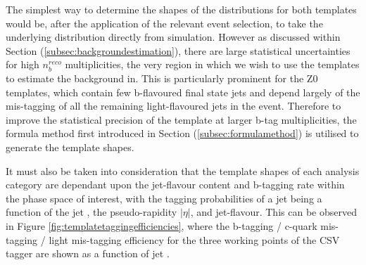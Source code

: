 The simplest way to determine the shapes of the \nbreco distributions for both templates would be, after the application of the relevant event selection, to take the underlying \nbreco distribution directly from simulation. However as discussed within Section (\ref{subsec:backgroundestimation}), there are large statistical uncertainties for high $n_{b}^{reco}$ multiplicities, the very region in which we wish to use the templates to estimate the background in. This is particularly prominent for the Z0 templates, which contain few b-flavoured final state jets and depend largely of the mis-tagging of all the remaining light-flavoured jets in the event. Therefore to improve the statistical precision of the template at larger b-tag multiplicities, the formula method first introduced in Section (\ref{subsec:formulamethod}) is utilised to generate the template shapes. 

It must also be taken into consideration that the template shapes of each analysis category are dependant upon the jet-flavour content and b-tagging rate within the phase space of interest, with the tagging probabilities of a jet being a function of the jet \pt, the pseudo-rapidity $\rvert\eta\lvert$, and jet-flavour. This can be observed in Figure \ref{fig:templatetaggingefficiencies}, where the b-tagging / c-quark mis-tagging / light mis-tagging efficiency for the three working points of the \ac{CSV} tagger are shown as a function of jet \pt. 

